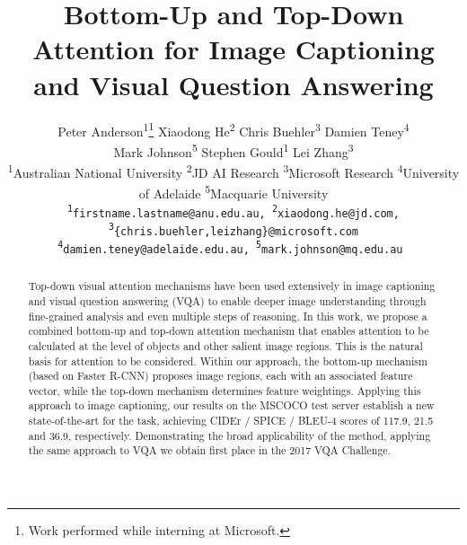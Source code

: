 \documentclass[10pt,twocolumn,letterpaper]{article}
\begin{document}
\title{Bottom-Up and Top-Down Attention for Image Captioning\\and Visual Question Answering}

\author{Peter Anderson\textsuperscript{1}\thanks{Work performed while interning at Microsoft.}\hspace{20pt} Xiaodong He\textsuperscript{2}\hspace{20pt} Chris Buehler\textsuperscript{3}\hspace{20pt} Damien Teney\textsuperscript{4}\\ Mark Johnson\textsuperscript{5}\hspace{20pt} Stephen Gould\textsuperscript{1}\hspace{20pt} Lei Zhang\textsuperscript{3}\\
	\normalsize{
		\textsuperscript{1}Australian National University \space
		\textsuperscript{2}JD AI Research \space
		\textsuperscript{3}Microsoft Research \space
		\textsuperscript{4}University of Adelaide \space
		\textsuperscript{5}Macquarie University
	}\\
	\tt\small\textsuperscript{1}firstname.lastname@anu.edu.au,
	\tt\small\textsuperscript{2}xiaodong.he@jd.com,
	\tt\small\textsuperscript{3}\{chris.buehler,leizhang\}@microsoft.com\\
	\tt\small\textsuperscript{4}damien.teney@adelaide.edu.au,
	\tt\small\textsuperscript{5}mark.johnson@mq.edu.au
}
\maketitle


\begin{abstract}
	
Top-down visual attention mechanisms have been used extensively in image captioning and visual question answering (VQA) to enable deeper image understanding through fine-grained analysis and even multiple steps of reasoning. In this work, we propose a combined bottom-up and top-down attention mechanism that enables attention to be calculated at the level of objects and other salient image regions. This is the natural basis for attention to be considered. Within our approach, the bottom-up mechanism (based on Faster R-CNN) proposes image regions, each with an associated feature vector, while the top-down mechanism determines feature weightings. Applying this approach to image captioning, our results on the MSCOCO test server establish a new state-of-the-art for the task, achieving CIDEr / SPICE / BLEU-4 scores of 117.9, 21.5 and 36.9, respectively. Demonstrating the broad applicability of the method, applying the same approach to VQA we obtain first place in the 2017 VQA Challenge.
\end{abstract}
\end{document}

